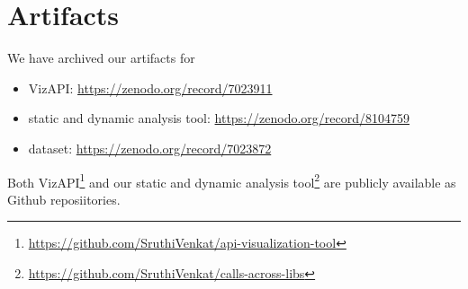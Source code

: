 \section{Artifacts}
\label{sec:artifacts}
We have archived our artifacts for
\begin{itemize}
\item VizAPI: \url{https://zenodo.org/record/7023911}
\item static and dynamic analysis tool: \url{https://zenodo.org/record/8104759}
\item dataset: \url{https://zenodo.org/record/7023872}
\end{itemize}
Both VizAPI\footnote{\url{https://github.com/SruthiVenkat/api-visualization-tool}} and our static and dynamic analysis tool\footnote{\url{https://github.com/SruthiVenkat/calls-across-libs}} are publicly available as Github reposiitories.